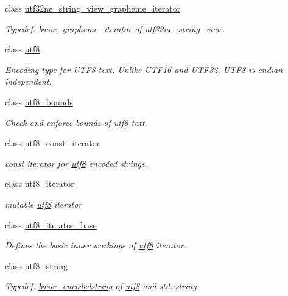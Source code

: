 \begin{DoxyCompactItemize}
class \hyperlink{classu5e_1_1utf32ne__string__view__grapheme__iterator}{utf32ne\+\_\+string\+\_\+view\+\_\+grapheme\+\_\+iterator}
\begin{DoxyCompactList}\small\item\em Typedef\+: \hyperlink{classu5e_1_1basic__grapheme__iterator}{basic\+\_\+grapheme\+\_\+iterator} of \hyperlink{classu5e_1_1utf32ne__string__view}{utf32ne\+\_\+string\+\_\+view}. \end{DoxyCompactList}\item 
class \hyperlink{classu5e_1_1utf8}{utf8}
\begin{DoxyCompactList}\small\item\em Encoding type for U\+T\+F8 text. Unlike U\+T\+F16 and U\+T\+F32, U\+T\+F8 is endian independent. \end{DoxyCompactList}\item 
class \hyperlink{classu5e_1_1utf8__bounds}{utf8\+\_\+bounds}
\begin{DoxyCompactList}\small\item\em Check and enforce bounds of \hyperlink{classu5e_1_1utf8}{utf8} text. \end{DoxyCompactList}\item 
class \hyperlink{classu5e_1_1utf8__const__iterator}{utf8\+\_\+const\+\_\+iterator}
\begin{DoxyCompactList}\small\item\em const iterator for \hyperlink{classu5e_1_1utf8}{utf8} encoded strings. \end{DoxyCompactList}\item 
class \hyperlink{classu5e_1_1utf8__iterator}{utf8\+\_\+iterator}
\begin{DoxyCompactList}\small\item\em mutable \hyperlink{classu5e_1_1utf8}{utf8} iterator \end{DoxyCompactList}\item 
class \hyperlink{classu5e_1_1utf8__iterator__base}{utf8\+\_\+iterator\+\_\+base}
\begin{DoxyCompactList}\small\item\em Defines the basic inner workings of \hyperlink{classu5e_1_1utf8}{utf8} iterator. \end{DoxyCompactList}\item 
class \hyperlink{classu5e_1_1utf8__string}{utf8\+\_\+string}
\begin{DoxyCompactList}\small\item\em Typedef\+: \hyperlink{classu5e_1_1basic__encodedstring}{basic\+\_\+encodedstring} of \hyperlink{classu5e_1_1utf8}{utf8} and std\+::string. \end{DoxyCompactList}\item 

\end{DoxyCompactItemize}
